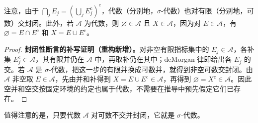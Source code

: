 \documentclass[../../main.tex]{subfiles}%
\begin{document}
\begin{remark}
注意，由于 $\bigcap_jE_j=(\bigcup_jE_j^{\mathrm{c}})^{\mathrm{c}}$，代数（分别地，$\sigma$-代数）也对有限（分别地，可数）交封闭。此外，若 $\mathscr{A}$ 为代数，则 $\varnothing\in\mathscr{A}$ 且 $X\in\mathscr{A}$，因为对 $E\in\mathscr{A}$，有 $\varnothing=E\cap E^{\mathrm{c}}$ 和 $X=E\cup E^{\mathrm{c}}$。
\end{remark}
\begin{proof}
\textbf{封闭性断言的补写证明（重构新增）。}对非空有限指标集中的 $E_j\in\mathscr{A}$，各补集 $E_j^{\mathrm c}\in\mathscr{A}$，其有限并仍在 $\mathscr{A}$ 中，再取补仍在其中；deMorgan 律即给出各 $E_j$ 的交。若 $\mathscr{A}$ 是 $\sigma$-代数，把这一步的有限并换成可数并，就得到非空可数交封闭。由 $\mathscr{A}$ 非空取 $E\in\mathscr{A}$，先由并和补得到 $X=E\cup E^{\mathrm c}\in\mathscr{A}$，再得到 $\varnothing=X^{\mathrm c}\in\mathscr{A}$。因此空并和空交按固定环境的约定也属于代数，不需要在推导中预先假定它们已存在。
\end{proof}




\begin{proposition}\label{proposition:ch01-disjointification}
值得注意的是，只要代数 $\mathscr{A}$ 对可数不交并封闭，它就是 $\sigma$-代数。
\end{proposition}
\end{document}

